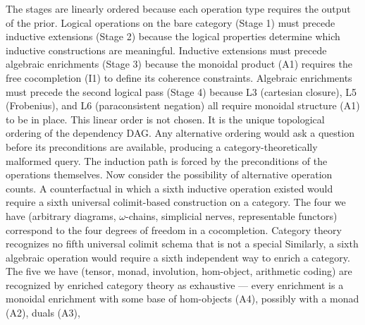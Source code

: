 \documentclass[12pt,a4paper]{article}
\begin{document}
\begin{center}


\end{center}

The stages are linearly ordered because each operation type requires the output of the prior. Logical operations on the
bare category (Stage 1) must precede inductive extensions (Stage 2) because the logical properties determine which
inductive constructions are meaningful. Inductive extensions must precede algebraic enrichments
(Stage 3) because the
monoidal product (A1) requires the free cocompletion (I1) to define its coherence constraints. Algebraic enrichments
must precede the second logical pass (Stage 4) because L3 (cartesian closure), L5 (Frobenius), and L6 (paraconsistent
negation) all require monoidal structure (A1) to be in place.
This linear order is not chosen. It is the unique topological ordering of the dependency DAG. Any alternative ordering
would ask a question before its preconditions are available, producing a category-theoretically malformed query. The
induction path is forced by the preconditions of the operations themselves.
Now consider the possibility of alternative operation counts. A counterfactual in which a sixth inductive operation
existed would require a sixth universal colimit-based construction on a category. The four we have
(arbitrary diagrams,
$\omega$-chains, simplicial nerves, representable functors) correspond to the four degrees of freedom in a
cocompletion. Category theory recognizes no fifth universal colimit schema that is not a special
Similarly, a sixth algebraic operation would require a sixth independent way to enrich a category. The five we have
(tensor, monad, involution, hom-object, arithmetic coding) are recognized by enriched category theory as exhaustive ---
every enrichment is a monoidal enrichment with some base of hom-objects (A4), possibly with a monad
(A2), duals (A3),
\end{document}
